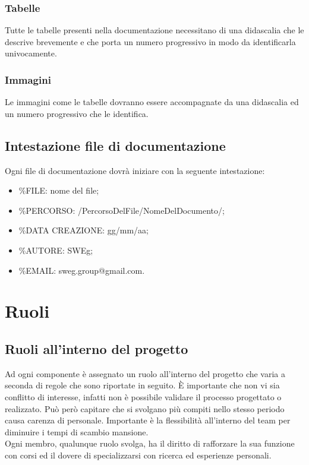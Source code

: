 \documentclass[12pt,a4paper,titlepage]{article}
\begin{document}
\subsubsection{Tabelle}
Tutte le tabelle presenti nella documentazione necessitano di una didascalia che le descrive brevemente e che porta un numero progressivo in modo da identificarla univocamente.

\subsubsection{Immagini}
Le immagini come le tabelle dovranno essere accompagnate da una didascalia ed un numero progressivo che le identifica.

\subsection{Intestazione file di documentazione}
Ogni file di documentazione dovrà iniziare con la seguente intestazione:
\begin{itemize}
	\item \%FILE: nome del file;
	\item \%PERCORSO: /PercorsoDelFile/NomeDelDocumento/;
	\item \%DATA CREAZIONE: gg/mm/aa;
	\item \%AUTORE: SWEg;
	\item \%EMAIL: sweg.group@gmail.com.
\end{itemize}

\newpage

\section{Ruoli}
\subsection{Ruoli all'interno del progetto}
Ad ogni componente è assegnato un ruolo all'interno del progetto che varia a seconda di regole che sono riportate in seguito. È importante che non vi sia conflitto di interesse, infatti non è possibile validare il processo progettato o realizzato. Può però capitare che si svolgano più compiti nello stesso periodo causa carenza di personale. Importante è la flessibilità all'interno del team per diminuire i tempi di scambio mansione.\\
Ogni membro, qualunque ruolo svolga, ha il diritto di rafforzare la sua funzione con corsi ed il dovere di specializzarsi con ricerca ed esperienze personali.
\end{document}
